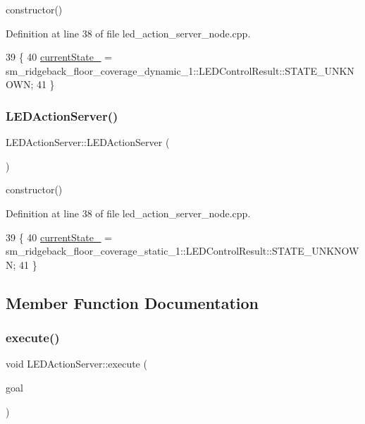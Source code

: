 constructor() 

Definition at line 38 of file led\+\_\+action\+\_\+server\+\_\+node.\+cpp.


\begin{DoxyCode}
39   \{
40     \hyperlink{classLEDActionServer_a1dc456e987dc331501ad6ff2215661ff}{currentState\_} =  sm\_ridgeback\_floor\_coverage\_dynamic\_1::LEDControlResult::STATE\_UNKNOWN;
41   \}
\end{DoxyCode}
\mbox{\label{classLEDActionServer_a6978c43940438b9fd8bfcd6b443092d3}} 
\subsubsection{\texorpdfstring{L\+E\+D\+Action\+Server()}{LEDActionServer()}\hspace{0.1cm}{\footnotesize\ttfamily [5/5]}}
{\footnotesize\ttfamily L\+E\+D\+Action\+Server\+::\+L\+E\+D\+Action\+Server (\begin{DoxyParamCaption}{ }\end{DoxyParamCaption})\hspace{0.3cm}{\ttfamily [inline]}}

constructor() 

Definition at line 38 of file led\+\_\+action\+\_\+server\+\_\+node.\+cpp.


\begin{DoxyCode}
39   \{
40     \hyperlink{classLEDActionServer_a1dc456e987dc331501ad6ff2215661ff}{currentState\_} =  sm\_ridgeback\_floor\_coverage\_static\_1::LEDControlResult::STATE\_UNKNOWN;
41   \}
\end{DoxyCode}


\subsection{Member Function Documentation}
\mbox{\label{classLEDActionServer_a2d8b9dfca1912e24170ef69a5edf5e9b}} 
\subsubsection{\texorpdfstring{execute()}{execute()}\hspace{0.1cm}{\footnotesize\ttfamily [1/5]}}
{\footnotesize\ttfamily void L\+E\+D\+Action\+Server\+::execute (\begin{DoxyParamCaption}\item[{const sm\+\_\+dance\+\_\+bot\+::\+L\+E\+D\+Control\+Goal\+Const\+Ptr \&}]{goal }\end{DoxyParamCaption})\hspace{0.3cm}{\ttfamily [inline]}}

